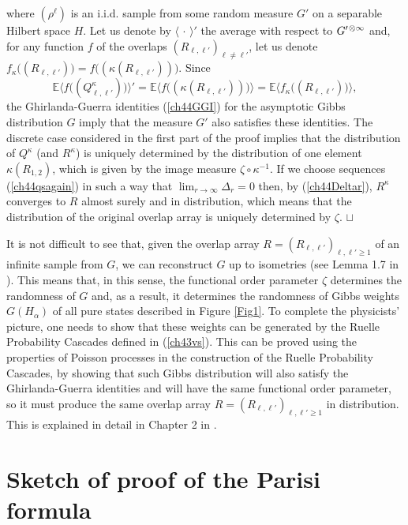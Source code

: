 \documentclass[12pt]{article}
\newcommand{\smsp}{\hspace{0.3mm}}
\newcommand{\e}{\mathbb{E}}
\newcommand{\la}{\langle}
\newcommand{\ra}{\rangle}
\newcommand\qed{\hfill\hbox{\rlap{$\sqcap$}$\sqcup$}}
\theoremstyle{nonumberplain}
\begin{document}
where $(\rho^{\ell})$ is an i.i.d. sample from some random measure $G'$ on a separable Hilbert space $H$. Let us denote by $\la\,\cdot\,\ra'$ the average with respect to ${G}^{\prime\smsp \otimes \infty}$ and, for any function $f$ of the overlaps $(R_{\ell,\ell'})_{\ell\not = \ell'}$, let us denote 
$
f_\kappa\bigl((R_{\ell,\ell'}) \bigr) = f\bigl((\kappa(R_{\ell,\ell'}))\bigr).
$ 
Since
$$
\e\bigl \la 
f\bigl((Q_{\ell,\ell'}^\kappa) \bigr)
\bigr\ra'
=
\e\bigl \la 
f\bigl((\kappa(R_{\ell,\ell'}))\bigr)
\bigr\ra
=
\e\bigl \la 
f_\kappa \bigl((R_{\ell,\ell'}) \bigr)
\bigr\ra,
$$
the Ghirlanda-Guerra identities (\ref{ch44GGI}) for the asymptotic Gibbs distribution $G$ imply that the measure $G'$ also satisfies these identities. The discrete case considered in the first part of the proof implies that the distribution of $Q^\kappa$ (and $R^\kappa$) is uniquely determined by the distribution of one element $\kappa(R_{1,2})$, which is given by the image measure $\zeta\circ \kappa^{-1}$. If we choose sequences (\ref{ch44qsagain}) in such a way that $\lim_{r\to\infty}\Delta_r = 0$ then, by (\ref{ch44Deltar}), $R^\kappa$ converges to $R$ almost surely and in distribution, which means that the distribution of the original overlap array is uniquely determined by $\zeta$. 
\qed

\medskip
It is not difficult to see that, given the overlap array $R=(R_{\ell,\ell'})_{\ell,\ell'\geq 1}$ of an infinite sample from $G$, we can reconstruct $G$ up to isometries (see Lemma 1.7 in \cite{SKmodel}).  This means that, in this sense, the functional order parameter $\zeta$ determines the randomness of $G$ and, as a result, it determines the randomness of Gibbs weights $G(H_\alpha)$ of all pure states described in Figure \ref{Fig1}. To complete the physicists' picture, one needs to show that these weights can be generated by the Ruelle Probability Cascades defined in (\ref{ch43vs}). This can be proved using the properties of Poisson processes in the construction of the Ruelle Probability Cascades, by showing that such Gibbs distribution will also satisfy the Ghirlanda-Guerra identities and will have the same functional order parameter, so it must produce the same overlap array $R=(R_{\ell,\ell'})_{\ell,\ell'\geq 1}$ in distribution. This is explained in detail in Chapter 2 in \cite{SKmodel}.







\section{Sketch of proof of the Parisi formula}\label{SecLabel-ParisiFormula}
\end{document}
